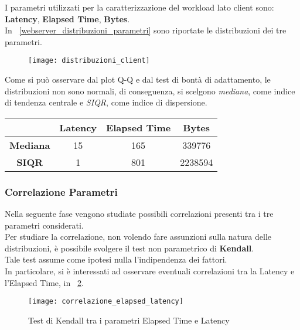 I parametri utilizzati per la caratterizzazione del workload lato client sono:
\textbf{Latency}, \textbf{Elapsed Time}, \textbf{Bytes}.\\

In \figurename~\ref{webserver_distribuzioni_parametri} sono riportate le distribuzioni dei
tre parametri.\\

\begin{figure}[!htbp]
  \centering
  \texttt{[image: distribuzioni\_client]}
  \caption{}
  \label{webserver_webserver_distribuzioni_parametri}
\end{figure}

Come si può osservare dal plot Q-Q e dal test di bontà di adattamento, le distribuzioni
non sono normali, di conseguenza, si scelgono \textit{mediana}, come indice di
tendenza centrale e \textit{SIQR}, come indice di dispersione.\\

\begin{center}
  \begin{tabular}{c|c|c|c|}
    & \textbf{Latency} & \textbf{Elapsed Time} & \textbf{Bytes} \\
    \hline
    \textbf{Mediana} & 15 & 165 & 339776 \\
    \hline
    \textbf{SIQR} & 1 & 801 & 2238594 \\
    \hline
  \end{tabular}
\end{center}

\subsubsection*{Correlazione Parametri}
Nella seguente fase vengono studiate possibili correlazioni presenti tra i tre
parametri considerati.\\
Per studiare la correlazione, non volendo fare assunzioni sulla natura delle
distribuzioni, è possibile svolgere il test non parametrico di \textbf{Kendall}.\\
Tale test assume come ipotesi nulla l'indipendenza dei fattori.\\
In particolare, si è interessati ad osservare eventuali correlazioni tra la Latency
e l'Elapsed Time, in \figurename~\ref{webserver_correlazione_elapsed_latency}.\\
\begin{figure}[!htbp]
  \centering
  \texttt{[image: correlazione\_elapsed\_latency]}
  \caption{Test di Kendall tra i parametri Elapsed Time e Latency}
  \label{webserver_correlazione_elapsed_latency}
\end{figure}

